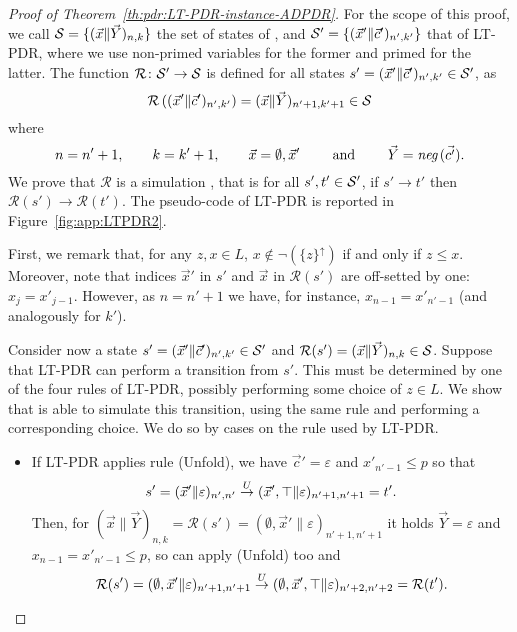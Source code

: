 \begin{proof}[Proof of Theorem~\ref{th:pdr:LT-PDR-instance-ADPDR}]
	For the scope of this proof, we call $\mathcal{S} = \{( \vec{x} \| \vec{Y} )_{n,k} \}$ the set of states of {\ADPDR}, and $\mathcal{S}' = \{ (\vec{x}'\| \vec{c}' )_{n',k'} \}$ that of LT-PDR, where we use non-primed variables for the former and primed for the latter.
	The function $\mathcal{R} \colon \mathcal{S}' \rightarrow \mathcal{S}$ is defined for all states $s' = ( \vec{x}' \| \vec{c}' )_{n',k'} \in \mathcal{S}'$, as
	\[
	\mathcal{R}\left( ( \vec{x}' \| \vec{c}' )_{n',k'} \right) = ( \vec{x} \| \vec{Y})_{n' + 1,k' + 1} \in \mathcal{S}
	\]
	where
	\[
	n = n' + 1, \qquad k = k' + 1, \qquad \vec{x} = \emptyset, \vec{x}' \qquad \text{ and } \qquad \vec{Y} = \textit{neg}\,(\vec{c'})\text{.}
	\]
	We prove that $\mathcal{R}$  is a simulation \cite{Milner89}, that is for all $s',t' \in \mathcal{S}'$, if $s' \rightarrow t'$ then $\mathcal{R}(s') \rightarrow \mathcal{R}(t')$. The pseudo-code of LT-PDR is reported in Figure~\ref{fig:app:LTPDR2}.

	First, we remark that, for any $z, x \in L$, $x \not\in \lnot (\{ z \}^{\uparrow})$ if and only if $z \leq x$. Moreover, note that indices $\vec{x}'$ in $s'$ and $\vec{x}$ in $\mathcal{R}(s')$ are off-setted by one: $x_j = x'_{j-1}$. However, as $n = n' + 1$ we have, for instance, $x_{n-1} = x'_{n'-1}$ (and analogously for $k'$).

	Consider now a state $s' = ( \vec{x}' \| \vec{c}' )_{n',k'} \in \mathcal{S}'$ and $\mathcal{R}(s') = ( \vec{x} \| \vec{Y} )_{n,k} \in \mathcal{S}$. Suppose that LT-PDR can perform a transition from $s'$. This must be determined by one of the four rules of LT-PDR, possibly performing some choice of $z \in L$. We show that {\ADPDR} is able to simulate this transition, using the same rule and performing a corresponding choice. We do so by cases on the rule used by LT-PDR.

	\begin{itemize}
		\item If LT-PDR applies rule (Unfold), we have $\vec{c}' = \varepsilon$ and $x'_{n'-1} \leq p$ so that
		      \[
		      s'=( \vec{x}' \| \varepsilon )_{n',n'} \stackrel{U}{\to} ( \vec{x}',\top \| \varepsilon)_{n'+1,n'+1}=t' \text{.}
		      \]
		      Then, for $( \vec{x} \| \vec{Y} )_{n,k} = \mathcal{R}(s') = ( \emptyset,\vec{x}' \| \varepsilon )_{n'+1,n'+1}$ it holds $\vec{Y} = \varepsilon$ and $x_{n-1} = x'_{n'-1} \leq p$, so {\ADPDR} can apply (Unfold) too and
		      \[
		      \mathcal{R}(s')=( \emptyset,\vec{x}' \| \varepsilon )_{n'+1,n'+1} \stackrel{U}{\to} ( \emptyset,\vec{x}',\top \| \varepsilon)_{n'+2,n'+2}=\mathcal{R}(t') \text{.}
		      \]


\end{itemize}
\end{proof}
